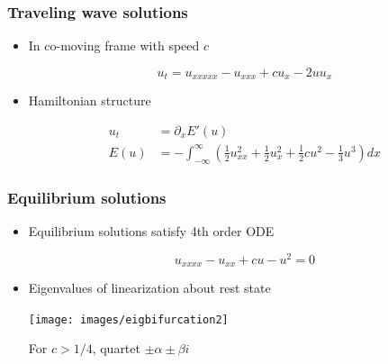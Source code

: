 \documentclass[16pt]{beamer}
\begin{document}
\begin{frame}
	\frametitle{Traveling wave solutions}
	\fontsize{16}{7.2}\selectfont
	\begin{itemize}
		\item In co-moving frame with speed $c$
		\begin{center}
		\[ u_t = u_{xxxxx} - u_{xxx} + c u_x - 2 u u_x \]
		\end{center}

		\item Hamiltonian structure
		\begin{center}
		\begin{align*} 
			u_t &= \partial_x E'(u) \\
			E(u) &= -\int_{-\infty}^{\infty} \left( \frac{1}{2}u_{xx}^2 + \frac{1}{2}u_x^2 + \frac{1}{2}cu^2 - \frac{1}{3}u^3 \right) dx 
		\end{align*}
		\end{center}
	\end{itemize}
\end{frame}


\begin{frame}
	\frametitle{Equilibrium solutions}
	\fontsize{16}{7.2}\selectfont
	\begin{itemize}
		\item Equilibrium solutions satisfy 4th order ODE
		\begin{center}
		\[u_{xxxx} - u_{xx} + cu - u^2 = 0\]
		\end{center}
		\vspace{0.25cm}
		\item Eigenvalues of linearization about rest state
		\begin{center}
		\texttt{[image: images/eigbifurcation2]}
		\end{center}
		For $c > 1/4$, quartet $\pm \alpha \pm \beta i$
	\end{itemize}
\end{frame}
\end{document}
